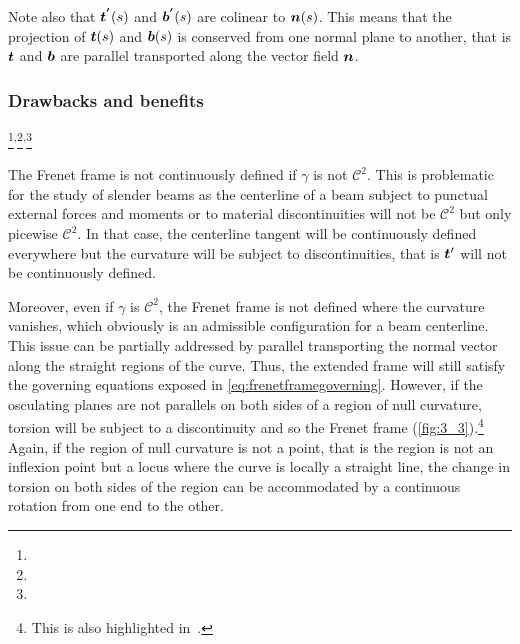 Note also that $\boldsymbol{t^{'}}(s)$ and $\boldsymbol{b^{'}}(s)$ are colinear to $\boldsymbol{n}(s)$. This means that the projection of $\boldsymbol{t}(s)$ and $\boldsymbol{b}(s)$ is conserved from one normal plane to another, that is $\boldsymbol{t}$ and $\boldsymbol{b}$ are parallel transported along the vector field $\boldsymbol{n}$.

\subsubsection{Drawbacks and benefits}\label{sec:frenetdrawbacks}
\footnote{}\textsuperscript{,}\footnote{}\textsuperscript{,}\footnote{}

The Frenet frame is not continuously defined if $\gamma$ is not $\mathcal{C}^2$. This is problematic for the study of slender beams as the centerline of a beam subject to punctual external forces and moments or to material discontinuities will not be $\mathcal{C}^2$ but only picewise $\mathcal{C}^2$. In that case, the centerline tangent will be continuously defined everywhere but the curvature will be subject to discontinuities, that is $\boldsymbol{t}'$ will not be continuously defined.

Moreover, even if $\gamma$ is $\mathcal{C}^2$, the Frenet frame is not defined where the curvature vanishes, which obviously is an admissible configuration for a beam centerline. This issue can be partially addressed by parallel transporting the normal vector along the straight regions of the curve. Thus, the extended frame will still satisfy the governing equations exposed in \cref{eq:frenetframegoverning}. However, if the osculating planes are not parallels on both sides of a region of null curvature, torsion will be subject to a discontinuity and so the Frenet frame (\cref{fig:3_3}).\footnote{This is also highlighted in~\cite{Bloomenthal1990, Wang2008}.} Again, if the region of null curvature is not a point, that is the region is not an inflexion point but a locus where the curve is locally a straight line, the change in torsion on both sides of the region can be accommodated by a continuous rotation from one end to the other.

